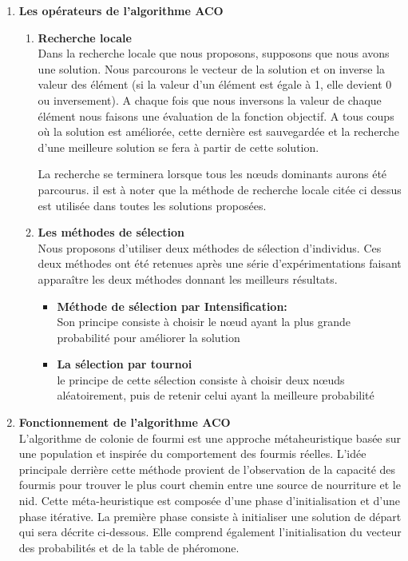 \begin{enumerate}
	\item \textbf{Les opérateurs de l’algorithme ACO}\\
\begin{enumerate}[label=\alph*)]
	\item \textbf{Recherche locale}\\
	Dans la recherche locale que nous proposons, supposons que nous avons une solution. Nous parcourons le vecteur de la solution et on inverse la valeur des élément (si la valeur d’un élément est égale à 1, elle devient 0 ou inversement). A chaque fois que nous inversons  la valeur  de chaque élément nous faisons une évaluation de la fonction objectif. A tous coups où la solution est améliorée, cette dernière est sauvegardée et la recherche d’une meilleure solution se fera à partir de cette solution.
	
La recherche se terminera lorsque tous  les nœuds dominants aurons été parcourus.
il est à noter que la méthode de recherche locale citée ci dessus est utilisée dans toutes les solutions proposées.
	
	\item \textbf{Les méthodes de sélection}\\
	Nous proposons d'utiliser deux méthodes de sélection d’individus. Ces deux méthodes ont été retenues après une série d'expérimentations faisant apparaître les deux méthodes donnant les meilleurs résultats.

	\begin{itemize}
		\item \textbf{Méthode de sélection par Intensification: }\\
		Son principe consiste à choisir le nœud ayant la plus grande probabilité pour améliorer la solution 
		
		\item \textbf{La sélection par tournoi}\\
		le principe de cette sélection consiste à choisir deux nœuds aléatoirement, puis de retenir celui ayant la meilleure probabilité 
	\end{itemize}
\end{enumerate}
	


	\item \textbf{Fonctionnement de l’algorithme ACO}\\
L’algorithme de colonie de fourmi est une approche métaheuristique basée sur une  population et inspirée du comportement des fourmis réelles. L’idée principale derrière cette méthode provient de l’observation de la capacité des fourmis pour trouver le plus court chemin entre une  source de nourriture et le nid.
Cette méta-heuristique est composée d’une phase d’initialisation et d’une phase itérative. La première phase consiste à initialiser une solution de départ qui sera décrite ci-dessous. Elle comprend également l’initialisation du vecteur des probabilités et de la table de phéromone.


\end{enumerate}
